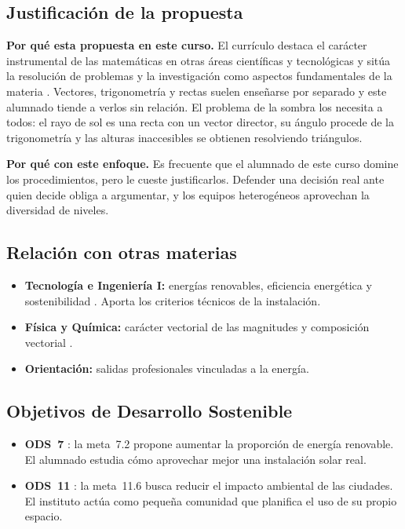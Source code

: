 \subsection{Justificación de la propuesta}
\textbf{Por qué esta propuesta en este curso.} El currículo destaca el carácter instrumental de las matemáticas en otras áreas científicas y tecnológicas y sitúa la resolución de problemas y la investigación como aspectos fundamentales de la materia \parencite[p.~320]{decreto64}. Vectores, trigonometría y rectas suelen enseñarse por separado y este alumnado tiende a verlos sin relación. El problema de la sombra los necesita a todos: el rayo de sol es una recta con un vector director, su ángulo procede de la trigonometría y las alturas inaccesibles se obtienen resolviendo triángulos.

\textbf{Por qué con este enfoque.} Es frecuente que el alumnado de este curso domine los procedimientos, pero le cueste justificarlos. Defender una decisión real ante quien decide obliga a argumentar, y los equipos heterogéneos aprovechan la diversidad de niveles.

\subsection{Relación con otras materias}
\begin{itemize}
  \item \textbf{Tecnología e Ingeniería I:} energías renovables, eficiencia energética y sostenibilidad \parencite[p.~385]{decreto64}. Aporta los criterios técnicos de la instalación.
  \item \textbf{Física y Química:} carácter vectorial de las magnitudes y composición vectorial \parencite[p.~166]{decreto64}.
  \item \textbf{Orientación:} salidas profesionales vinculadas a la energía.
\end{itemize}

\subsection{Objetivos de Desarrollo Sostenible}
\begin{itemize}
  \item \textbf{ODS~7} \parencite{onu7}: la meta~7.2 propone aumentar la proporción de energía renovable. El alumnado estudia cómo aprovechar mejor una instalación solar real.
  \item \textbf{ODS~11} \parencite{onu11}: la meta~11.6 busca reducir el impacto ambiental de las ciudades. El instituto actúa como pequeña comunidad que planifica el uso de su propio espacio.
\end{itemize}
